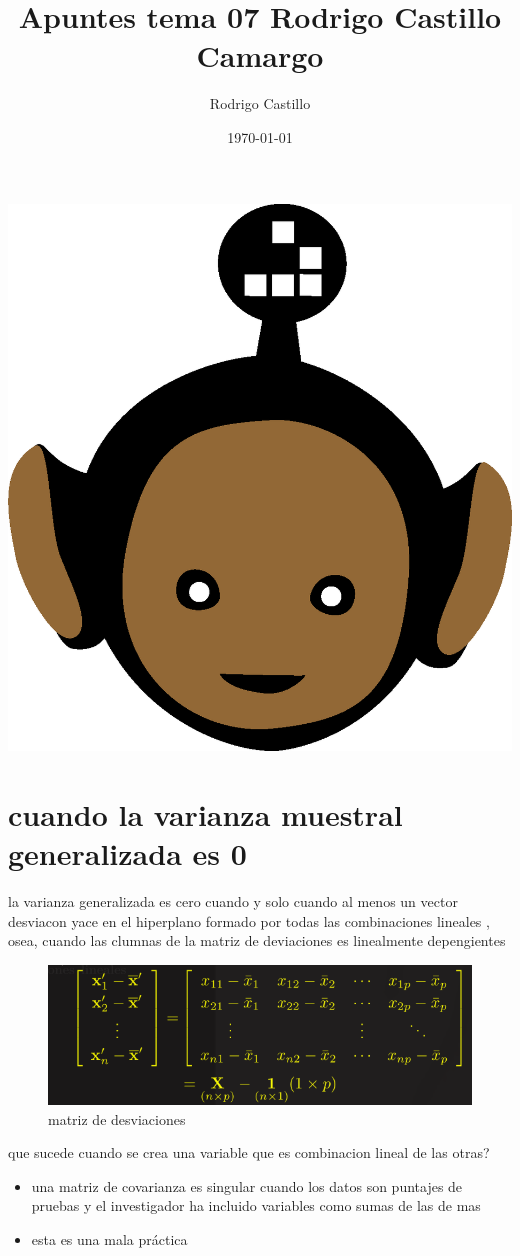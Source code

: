 \documentclass[10pt,a4paper]{article} %
\begin{document}
    \title{{  Apuntes tema 07 Rodrigo Castillo Camargo  }}
    \author{{Rodrigo Castillo}}
    \date{\today}

    \maketitle


    \includegraphics[width=0.1\linewidth]{negro_cara.png}

    \section{cuando la varianza muestral generalizada es 0}
        la varianza generalizada es cero \color{red} cuando y solo cuando
        \color{white}  al menos un vector desviacon yace en el hiperplano
        formado por todas las combinaciones lineales , osea,  cuando las
        clumnas de la matriz de deviaciones es linealmente depengientes
        \begin{figure}[h!]
            \centering
            \includegraphics[width=0.8\linewidth]{matrizdesviaciones.png}
            \caption{matriz de desviaciones}
            \label{matriz desviaciones}
        \end{figure}

        que sucede cuando se crea una variable que es combinacion lineal de las
        otras?
        \begin{itemize}
            \item {una matriz de covarianza es \color{red} singular
                \color{white}  cuando los datos son puntajes de pruebas y el
                investigador ha incluido variables como sumas de las de mas}
            \item {esta es una \color{red} mala práctica \color{white} }
        \end{itemize}
\end{document}
